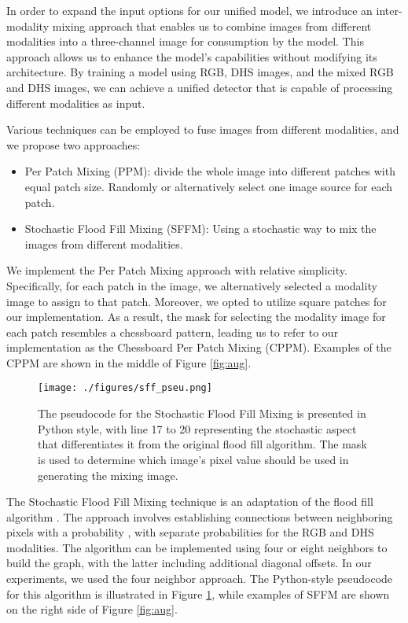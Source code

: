 \documentclass[]{modified_llncs}
\begin{document}
In order to expand the input options for our unified model, we introduce an inter-modality mixing approach that enables us to combine images from different modalities into a three-channel image for consumption by the model. This approach allows us to enhance the model's capabilities without modifying its architecture. By training a model using RGB, DHS images, and the mixed RGB and DHS images, we can achieve a unified detector that is capable of processing different modalities as input.

Various techniques can be employed to fuse images from different modalities, and we propose two approaches:
\begin{itemize}
    \item Per Patch Mixing (PPM): divide the whole image into different patches with equal patch size. Randomly or alternatively select one image source for each patch.
    \item Stochastic Flood Fill Mixing (SFFM): Using a stochastic way to mix the images from different modalities.
\end{itemize}
We implement the Per Patch Mixing approach with relative simplicity. Specifically, for each patch in the image, we alternatively selected a modality image to assign to that patch. Moreover, we opted to utilize square patches for our implementation. As a result, the mask for selecting the modality image for each patch resembles a chessboard pattern, leading us to refer to our implementation as the Chessboard Per Patch Mixing (CPPM). Examples of the CPPM are shown in the middle of Figure \ref{fig:aug}.\\
\begin{figure}[H]
\begin{center}
\texttt{[image: ./figures/sff\_pseu.png]}
\end{center}
    \caption{The pseudocode for the Stochastic Flood Fill Mixing is presented in Python style, with line 17 to 20 representing the stochastic aspect that differentiates it from the original flood fill algorithm. The mask is used to determine which image's pixel value should be used in generating the mixing image.}
\label{fig:sff}
\end{figure}
The Stochastic Flood Fill Mixing technique is an adaptation of the flood fill algorithm \cite{enwiki:floodfill}. The approach involves establishing connections between neighboring pixels with a probability , with separate probabilities for the RGB and DHS modalities. The algorithm can be implemented using four or eight neighbors to build the graph, with the latter including additional diagonal offsets. In our experiments, we used the four neighbor approach. The Python-style pseudocode for this algorithm is illustrated in Figure \ref{fig:sff}, while examples of SFFM are shown on the right side of Figure \ref{fig:aug}.\\
\end{document}
